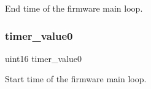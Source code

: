 End time of the firmware main loop. \mbox{\label{globals_8c_a82c5883d1d4a600a1073686f917a812d}} 
\subsubsection{timer\+\_\+value0}
{\footnotesize\ttfamily uint16 timer\+\_\+value0}

Start time of the firmware main loop. 